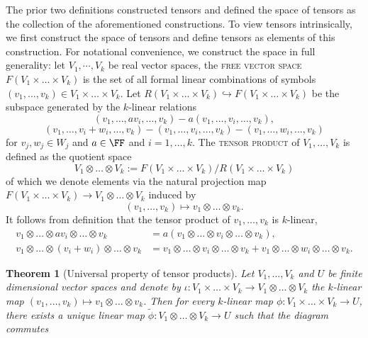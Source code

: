 \documentclass[reqno]{amsart}
\newtheorem{theorem}{Theorem}
\theoremstyle{definition}
\theoremstyle{remark}
\renewcommand{\emph}{\textsc}
\begin{document}
The prior two definitions constructed tensors and defined the space of tensors as the collection of the aforementioned constructions. To view tensors intrinsically, we first construct the space of tensors and define tensors as elements of this construction. For notational convenience, we construct the space in full generality: let $V_1, \cdots, V_k$ be real vector spaces, the \emph{free vector space} $F(V_1 \times \dots \times V_k)$ is the set of all formal linear combinations of symbols $(v_1, \dots, v_k) \in V_1 \times \dots \times V_k$. Let $R(V_1 \times \dots \times V_k) \hookrightarrow F(V_1 \times \dots \times V_k)$ be the subspace generated by the $k$-linear relations
	\[		(v_1, \dots, av_i, \dots, v_k) - a(v_1, \dots, v_i, \dots, v_k), \]
	\[	
		(v_1, \dots, v_i + w_i, \dots, v_k) - (v_1, \dots, v_i, \dots, v_k) - (v_1, \dots, w_i, \dots, v_k)
	\]
for $v_j, w_j \in W_j$ and $a \in \FF$ and $i = 1, \dots, k$. The \emph{tensor product} of $V_1, \dots, V_k$ is defined as the quotient space
	\[ V_1 \otimes \dots \otimes V_k := F(V_1 \times \dots \times V_k) / R(V_1 \times \dots \times V_k)\]
of which we denote elements via the natural projection map $F(V_1 \times \dots \times V_k) \to V_1 \otimes \dots \otimes V_k$ induced by 
	\[ (v_1, \dots, v_k) \mapsto v_1 \otimes \dots \otimes v_k. \]
It follows from definition that the tensor product of $v_1, \dots, v_k$ is $k$-linear,
\begin{align*}
	v_1 \otimes \dots \otimes a v_i \otimes \dots \otimes v_k 
		&= a(v_1 \otimes \dots \otimes v_i \otimes \dots \otimes v_k), \\
	v_1 \otimes \dots \otimes (v_i + w_i) \otimes \dots \otimes v_k
		&= v_1 \otimes \dots \otimes v_i \otimes \dots \otimes v_k + v_1 \otimes \dots \otimes w_i \otimes \dots \otimes v_k. 	
\end{align*}


\begin{theorem}[Universal property of tensor products]
	Let $V_1, \dots, V_k$ and $U$ be finite dimensional vector spaces and denote by $\iota : V_1 \times \dots \times V_k \to V_1 \otimes \dots \otimes V_k$ the $k$-linear map $(v_1, \dots, v_k) \mapsto v_1 \otimes \dots \otimes v_k$. Then for every $k$-linear map $\phi : V_1 \times \dots \times V_k \to U$, there exists a unique linear map $\widetilde \phi :  V_1 \otimes \dots \otimes V_k  \to U$ such that the diagram commutes
	\begin{center}
	\end{center}
\end{theorem}
\end{document}
